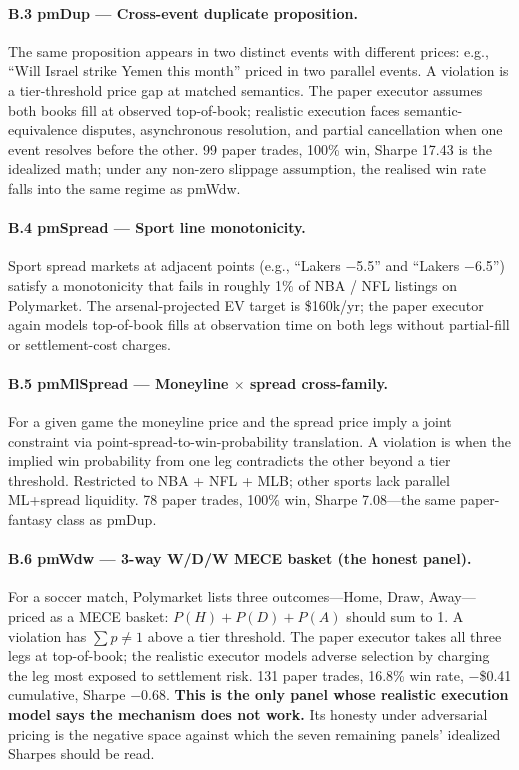 \documentclass[11pt]{article}
\begin{document}
\paragraph{B.3 pmDup --- Cross-event duplicate proposition.}
The same proposition appears in two distinct events with different prices: e.g., ``Will Israel strike Yemen this month'' priced in two parallel events. A violation is a tier-threshold price gap at matched semantics. The paper executor assumes both books fill at observed top-of-book; realistic execution faces semantic-equivalence disputes, asynchronous resolution, and partial cancellation when one event resolves before the other. 99 paper trades, 100\% win, Sharpe 17.43 is the idealized math; under any non-zero slippage assumption, the realised win rate falls into the same regime as pmWdw.

\paragraph{B.4 pmSpread --- Sport line monotonicity.}
Sport spread markets at adjacent points (e.g., ``Lakers $-$5.5'' and ``Lakers $-$6.5'') satisfy a monotonicity that fails in roughly 1\% of NBA / NFL listings on Polymarket. The arsenal-projected EV target is \$160k/yr; the paper executor again models top-of-book fills at observation time on both legs without partial-fill or settlement-cost charges.

\paragraph{B.5 pmMlSpread --- Moneyline $\times$ spread cross-family.}
For a given game the moneyline price and the spread price imply a joint constraint via point-spread-to-win-probability translation. A violation is when the implied win probability from one leg contradicts the other beyond a tier threshold. Restricted to NBA + NFL + MLB; other sports lack parallel ML+spread liquidity. 78 paper trades, 100\% win, Sharpe 7.08---the same paper-fantasy class as pmDup.

\paragraph{B.6 pmWdw --- 3-way W/D/W MECE basket (the honest panel).}
For a soccer match, Polymarket lists three outcomes---Home, Draw, Away---priced as a MECE basket: $P(H) + P(D) + P(A)$ should sum to 1. A violation has $\sum p \neq 1$ above a tier threshold. The paper executor takes all three legs at top-of-book; the realistic executor models adverse selection by charging the leg most exposed to settlement risk. 131 paper trades, 16.8\% win rate, $-$\$0.41 cumulative, Sharpe $-$0.68. \textbf{This is the only panel whose realistic execution model says the mechanism does not work.} Its honesty under adversarial pricing is the negative space against which the seven remaining panels' idealized Sharpes should be read.
\end{document}
